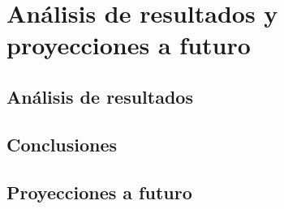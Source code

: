 \chapter{Análisis de resultados y proyecciones a futuro}\label{CAP8}

\section{Análisis de resultados }
\section{Conclusiones}
\section{Proyecciones a futuro}


